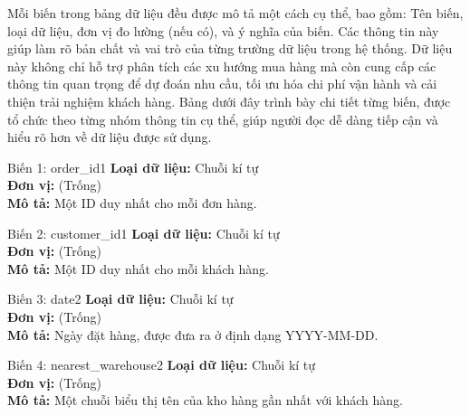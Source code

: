Mỗi biến trong bảng dữ liệu đều được mô tả một cách cụ thể, bao gồm: Tên biến, loại dữ liệu, đơn vị đo lường (nếu có), và ý nghĩa của biến.
Các thông tin này giúp làm rõ bản chất và vai trò của từng trường dữ liệu trong hệ thống. Dữ liệu này không chỉ hỗ trợ phân tích các xu hướng mua hàng mà còn cung cấp các thông tin quan trọng để dự đoán nhu cầu, tối ưu hóa chi phí vận hành và cải thiện trải nghiệm khách hàng. Bảng dưới đây trình bày chi tiết từng biến, được tổ chức theo từng nhóm thông tin cụ thể, giúp người đọc dễ dàng tiếp cận và hiểu rõ hơn về dữ liệu được sử dụng.

\vspace{0.5cm}

\noindent
\begin{minipage}[t]{0.48\textwidth}
\begin{mainbox}{Biến 1: order\_id}{1}
    \textbf{Loại dữ liệu:} Chuỗi kí tự \\
    \textbf{Đơn vị:} (Trống) \\
    \textbf{Mô tả:} Một ID duy nhất cho mỗi đơn hàng.
\end{mainbox}
\end{minipage}
\hfill
\begin{minipage}[t]{0.48\textwidth}
\begin{mainbox}{Biến 2: customer\_id}{1}
    \textbf{Loại dữ liệu:} Chuỗi kí tự \\
    \textbf{Đơn vị:} (Trống) \\
    \textbf{Mô tả:} Một ID duy nhất cho mỗi khách hàng.
\end{mainbox}
\end{minipage}

\vspace{0.5cm}

\noindent
\begin{minipage}[t]{0.48\textwidth}
\begin{mainbox}{Biến 3: date}{2}
    \textbf{Loại dữ liệu:} Chuỗi kí tự \\
    \textbf{Đơn vị:} (Trống) \\
    \textbf{Mô tả:} Ngày đặt hàng, được đưa ra ở định dạng YYYY-MM-DD.
\end{mainbox}
\end{minipage}
\hfill
\begin{minipage}[t]{0.48\textwidth}
\begin{mainbox}{Biến 4: nearest\_warehouse}{2}
    \textbf{Loại dữ liệu:} Chuỗi kí tự \\
    \textbf{Đơn vị:} (Trống) \\
    \textbf{Mô tả:} Một chuỗi biểu thị tên của kho hàng gần nhất với khách hàng.
\end{mainbox}
\end{minipage}

